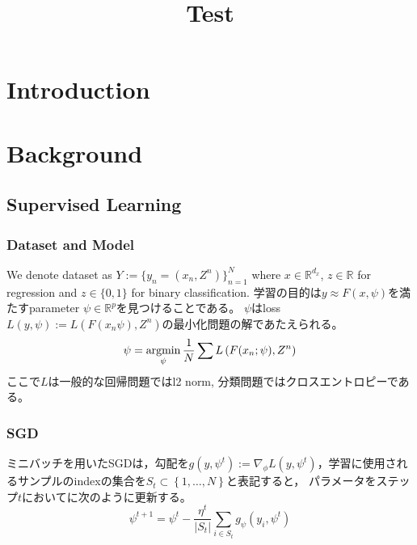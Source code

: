 \documentclass{article}
\title{Test}
\author{}
\begin{document}
\listoftodos

\maketitle

\begin{abstract}
\end{abstract}

\section{Introduction}

\section{Background}
    \label{prior}
    \subsection{Supervised Learning}
        \subsubsection{Dataset and Model}
            We denote dataset as \(Y:= \{y_n = \left(  x_n , Z^n  \right)\} ^{N}_{n=1} \)
            where \(x \in \mathbb{R}^{d_x}\), \(z \in \mathbb{R}\)  for regression and \(z \in  \{ 0,1 \}\) for binary classification.
            学習の目的は\( y \approx F \left( x, \psi \right) \)を満たすparameter \(\psi \in \mathbb{R}^{p}\)を見つけることである。
            \(\psi\)はloss \(L \left( y, \psi \right) := L \left( F(x_n \psi) ,Z^{n} \right)\)の最小化問題の解であたえられる。
            \begin{equation}
                \psi = \mathop{\rm argmin}\limits_{ \psi }\frac{1}{N} \sum L \left( F(x_n;\psi) ,Z^{n} \right)
            \end{equation}
            ここで\(L\)は一般的な回帰問題ではl2 norm, 分類問題ではクロスエントロピーである。
            
          \subsubsection{SGD}
            ミニバッチを用いたSGDは，勾配を\( g \left( y, \psi ^{t} \right) := \nabla _{ \phi }L \left( y, \psi ^{t} \right) \)，学習に使用されるサンプルのindexの集合を\(S_t \subset  \left\{ 1,  \ldots , N \right\}\)と表記すると，
            パラメータをステップ\(t\)においてに次のように更新する。    
            \begin{equation}
                \psi ^{t+1} 
                = \psi ^{t} 
                -\frac{\eta^{t}}{ \vert S_{t} \vert }  \sum _{i \in S_{t}}g_\psi\left( y_{i},\psi^{t}\right)
            \end{equation}




\end{document}
